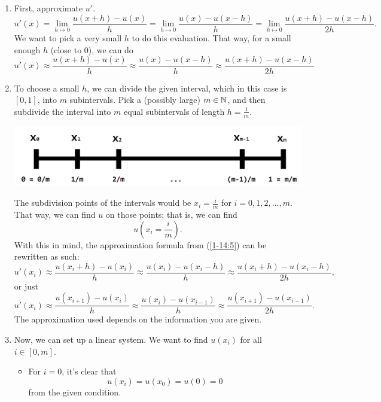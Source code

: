 \documentclass[letterpaper]{article}
\newcommand{\0}{\mathbf{0}}
\begin{document}
\begin{enumerate}
    \item First, approximate $u'$. 
    \[u'(x) = \lim_{h \mapsto 0} \frac{u(x + h) - u(x)}{h} = \lim_{h \mapsto 0} \frac{u(x) - u(x - h)}{h} = \lim_{h \mapsto 0} \frac{u(x + h) - u(x - h)}{2h}.\]
    We want to pick a very small $h$ to do this evaluation. That way, for a small enough $h$ (close to 0), we can do 
    \begin{equation}\label{1-14:5}
        u'(x) \approx \frac{u(x + h) - u(x)}{h} \approx \frac{u(x) - u(x - h)}{h} \approx \frac{u(x + h) - u(x - h)}{2h}
    \end{equation}

    \item To choose a small $h$, we can divide the given interval, which in this case is $[0, 1]$, into $m$ subintervals. Pick a (possibly large) $m \in \mathbb{N}$, and then subdivide the interval into $m$ equal subintervals of length $h = \frac{1}{m}$. 
    
    \begin{center}
        \includegraphics[scale=0.4]{assets/sub_divide.png}
    \end{center}
    
    The subdivision points of the intervals would be $x_i = \frac{i}{m}$ for $i = 0, 1, 2, \hdots, m$. That way, we can find $u$ on those points; that is, we can find \[u\left(x_i = \frac{i}{m}\right).\] 
    With this in mind, the approximation formula from (\ref{1-14:5}) can be rewritten as such:
    \[u'(x_i) \approx \frac{u(x_i + h) - u(x_i)}{h} \approx \frac{u(x_i) - u(x_i - h)}{h} \approx \frac{u(x_i + h) - u(x_i - h)}{2h},\]
    or just 
    \[u'(x_i) \approx \frac{u(x_{i + 1}) - u(x_{i})}{h} \approx \frac{u(x_i) - u(x_{i - 1})}{h} \approx \frac{u(x_{i + 1}) - u(x_{i - 1})}{2h}.\] 
    The approximation used depends on the information you are given.
    \item Now, we can set up a linear system. We want to find $u(x_i)$ for all $i \in [0, m]$. 
    \begin{itemize}
        \item For $i = 0$, it's clear that 
        \[u(x_i) = u(x_0) = u(0) = 0\]
        from the given condition.


\end{itemize}
\end{enumerate}
\end{document}
